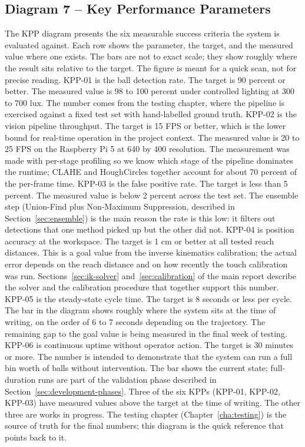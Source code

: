 \clearpage

\subsection{Diagram 7 -- Key Performance Parameters}
\label{app:kpp-diagram}
The KPP diagram presents the six measurable success criteria the system is evaluated against. Each
row shows the parameter, the target, and the measured value where one exists. The bars are not to
exact scale; they show roughly where the result sits relative to the target. The figure is meant for a
quick scan, not for precise reading.
KPP-01 is the ball detection rate. The target is 90 percent or better. The measured value is 98 to 100
percent under controlled lighting at 300 to 700 lux. The number comes from the testing chapter,
where the pipeline is exercised against a fixed test set with hand-labelled ground truth.
KPP-02 is the vision pipeline throughput. The target is 15 FPS or better, which is the lower bound for
real-time operation in the project context. The measured value is 20 to 25 FPS on the Raspberry Pi 5 at
640 by 400 resolution. The measurement was made with per-stage profiling so we know which stage of
the pipeline dominates the runtime; CLAHE and HoughCircles together account for about 70 percent of
the per-frame time.
KPP-03 is the false positive rate. The target is less than 5 percent. The measured value is below 2
percent across the test set. The ensemble step (Union-Find plus Non-Maximum Suppression,
described in Section~\ref{sec:ensemble}) is the main reason the rate is this low: it filters out detections that one
method picked up but the other did not.
KPP-04 is position accuracy at the workspace. The target is 1 cm or better at all tested reach distances.
This is a goal value from the inverse kinematics calibration; the actual error depends on the reach
distance and on how recently the touch calibration was run. Sections~\ref{sec:ik-solver} and~\ref{sec:calibration} of the main report
describe the solver and the calibration procedure that together support this number.
KPP-05 is the steady-state cycle time. The target is 8 seconds or less per cycle. The bar in the diagram
shows roughly where the system sits at the time of writing, on the order of 6 to 7 seconds depending
on the trajectory. The remaining gap to the goal value is being measured in the final week of testing.
KPP-06 is continuous uptime without operator action. The target is 30 minutes or more. The number is
intended to demonstrate that the system can run a full bin worth of balls without intervention. The bar
shows the current state; full-duration runs are part of the validation phase described in Section~\ref{sec:development-phases}.
Three of the six KPPs (KPP-01, KPP-02, KPP-03) have measured values above the target at the time of
writing. The other three are works in progress. The testing chapter (Chapter~\ref{cha:testing}) is the source of truth
for the final numbers; this diagram is the quick reference that points back to it.


